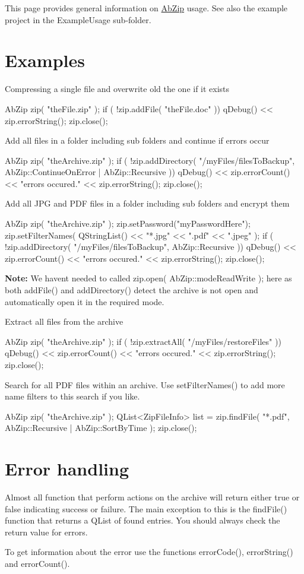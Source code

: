 This page provides general information on \hyperlink{class_ab_zip}{Ab\+Zip} usage. See also the example project in the \textquotesingle{}Example\+Usage\textquotesingle{} sub-\/folder.\hypertarget{usage_examples}{}\section{Examples}\label{usage_examples}
Compressing a single file and overwrite old the one if it exists \begin{DoxyVerb}   AbZip zip( "theFile.zip" );
   if ( !zip.addFile( "theFile.doc" ))
    qDebug() << zip.errorString();
   zip.close();
\end{DoxyVerb}


Add all files in a folder including sub folders and continue if errors occur \begin{DoxyVerb}   AbZip zip( "theArchive.zip" );
   if ( !zip.addDirectory( "/myFiles/filesToBackup", AbZip::ContinueOnError | AbZip::Recursive ))
    qDebug() << zip.errorCount() << "errors occured.\n" << zip.errorString();
   zip.close();
\end{DoxyVerb}


Add all J\+PG and P\+DF files in a folder including sub folders and encrypt them \begin{DoxyVerb}   AbZip zip( "theArchive.zip" );
   zip.setPassword("myPasswordHere");
   zip.setFilterNames( QStringList() << "*.jpg" << ".pdf" << ".jpeg" );
   if ( !zip.addDirectory( "/myFiles/filesToBackup", AbZip::Recursive ))
    qDebug() << zip.errorCount() << "errors occured.\n" << zip.errorString();
   zip.close();
\end{DoxyVerb}


{\bfseries Note\+:} We haven\textquotesingle{}t needed to called zip.\+open( Ab\+Zip\+::mode\+Read\+Write ); here as both add\+File() and add\+Directory() detect the archive is not open and automatically open it in the required mode.

Extract all files from the archive \begin{DoxyVerb}   AbZip zip( "theArchive.zip" );
   if ( !zip.extractAll( "/myFiles/restoreFiles" ))
    qDebug() << zip.errorCount() << "errors occured.\n" << zip.errorString();
   zip.close();
\end{DoxyVerb}


Search for all P\+DF files within an archive. Use set\+Filter\+Names() to add more name filters to this search if you like. \begin{DoxyVerb}   AbZip zip( "theArchive.zip" );
   QList<ZipFileInfo> list = zip.findFile( "*.pdf", AbZip::Recursive | AbZip::SortByTime );
   zip.close();
\end{DoxyVerb}
\hypertarget{usage_error-handling}{}\section{Error handling}\label{usage_error-handling}
Almost all function that perform actions on the archive will return either {\ttfamily true} or {\ttfamily false} indicating success or failure. The main exception to this is the find\+File() function that returns a Q\+List of found entries. You should always check the return value for errors.

To get information about the error use the functions error\+Code(), error\+String() and error\+Count(). 